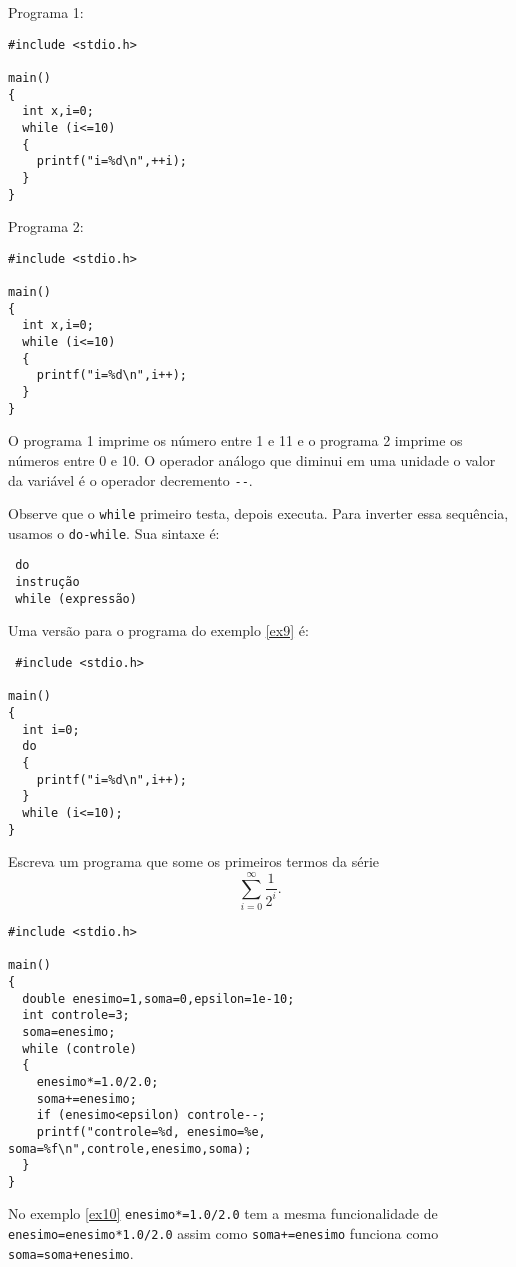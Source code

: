 Programa 1:
\begin{verbatim}
#include <stdio.h>

main()
{
  int x,i=0;
  while (i<=10)
  {
    printf("i=%d\n",++i);
  }
}
\end{verbatim}

Programa 2:
\begin{verbatim}
#include <stdio.h>

main()
{
  int x,i=0;
  while (i<=10)
  {
    printf("i=%d\n",i++);
  }
}
\end{verbatim}

O programa 1 imprime os número entre 1 e 11 e o programa 2 imprime os números entre 0 e 10. O operador análogo que diminui em uma unidade o valor da variável é o operador decremento \verb|--|.

Observe que o \verb|while| primeiro testa, depois executa. Para inverter essa sequência, usamos o \verb|do-while|. Sua sintaxe é: 
\begin{verbatim}
 do
 instrução 
 while (expressão)
\end{verbatim}
Uma versão para o programa do exemplo \ref{ex9} é:
\begin{verbatim}
 #include <stdio.h>

main()
{
  int i=0;
  do
  {
    printf("i=%d\n",i++);	  
  }
  while (i<=10);
}
\end{verbatim}

\begin{ex}\label{ex10}Escreva um programa que some os primeiros termos da série
$$
\sum_{i=0}^\infty \frac{1}{2^i} .
$$
\end{ex}
\begin{verbatim}
#include <stdio.h>

main()
{
  double enesimo=1,soma=0,epsilon=1e-10;
  int controle=3;
  soma=enesimo;
  while (controle)
  {
    enesimo*=1.0/2.0;
    soma+=enesimo;
    if (enesimo<epsilon) controle--;
    printf("controle=%d, enesimo=%e, soma=%f\n",controle,enesimo,soma);
  }
}
\end{verbatim}
No exemplo \ref{ex10} \verb|enesimo*=1.0/2.0| tem a mesma funcionalidade de \verb|enesimo=enesimo*1.0/2.0| assim como \verb|soma+=enesimo| funciona como \verb|soma=soma+enesimo|. 


